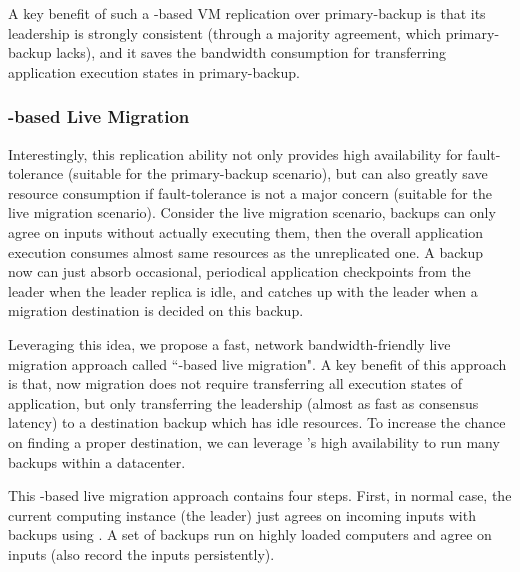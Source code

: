 A key benefit of such a \paxos-based VM replication over primary-backup is that 
its leadership is strongly consistent (through a majority agreement, which 
primary-backup lacks), and it saves the bandwidth consumption for transferring 
application execution states in primary-backup.


\vspace{-.15in}\subsubsection{\paxos-based Live Migration} 
\label{sec:vm-migration}\vspace{-.075in}

Interestingly, this replication ability not only provides high 
availability for fault-tolerance (suitable for the primary-backup scenario), 
but can also greatly save resource consumption if fault-tolerance is not a 
major concern (suitable for the live migration scenario). Consider the live 
migration scenario, \paxos backups can only agree on inputs without actually 
executing them, then the overall application execution consumes almost same 
resources as the unreplicated one. A backup now can just absorb occasional, 
periodical application checkpoints from the leader when the leader replica is 
idle, and catches up with the leader when a migration destination is decided on 
this backup.

Leveraging this idea, we propose a fast, network bandwidth-friendly live 
migration approach called ``\paxos-based live migration". A key benefit of this 
approach is that, now migration does not require transferring all execution 
states of application, but only transferring the \paxos leadership (almost as 
fast as \paxos consensus latency) to a destination backup which has idle 
resources. To increase the chance on finding a proper destination, we can 
leverage \falcon's high availability to run many backups within a datacenter.

This \paxos-based live migration approach contains four steps. First, in 
normal case, the current computing instance (the leader) just agrees on 
incoming inputs with backups using \falcon. A set of backups run on highly 
loaded computers and agree on inputs (also record the inputs persistently). 

